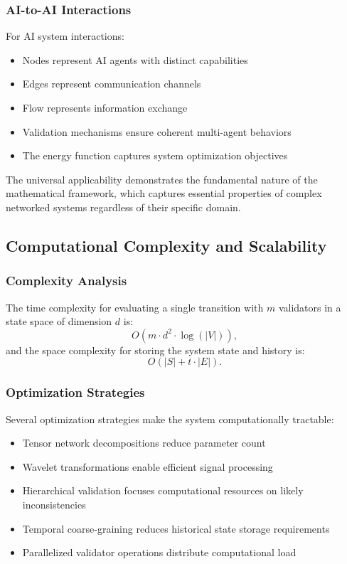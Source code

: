\documentclass[11pt,a4paper]{article}
\begin{document}
\subsubsection{AI-to-AI Interactions}

For AI system interactions:
\begin{itemize}
\item Nodes represent AI agents with distinct capabilities
\item Edges represent communication channels
\item Flow represents information exchange
\item Validation mechanisms ensure coherent multi-agent behaviors
\item The energy function captures system optimization objectives
\end{itemize}

The universal applicability demonstrates the fundamental nature of the mathematical framework, which captures essential properties of complex networked systems regardless of their specific domain.

\subsection{Computational Complexity and Scalability}

\subsubsection{Complexity Analysis}

The time complexity for evaluating a single transition with $m$ validators in a state space of dimension $d$ is:
\begin{equation}
O(m \cdot d^2 \cdot \log(|V|)),
\end{equation}
and the space complexity for storing the system state and history is:
\begin{equation}
O(|S| + t \cdot |E|).
\end{equation}

\subsubsection{Optimization Strategies}

Several optimization strategies make the system computationally tractable:
\begin{itemize}
\item Tensor network decompositions reduce parameter count
\item Wavelet transformations enable efficient signal processing
\item Hierarchical validation focuses computational resources on likely inconsistencies
\item Temporal coarse-graining reduces historical state storage requirements
\item Parallelized validator operations distribute computational load
\end{itemize}
\end{document}
